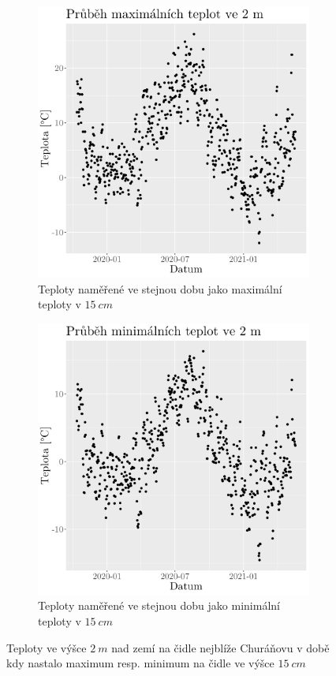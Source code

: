 \begin{figure}
	\centering
	\begin{subfigure}{0.45\textwidth}
  \includegraphics[width=\textwidth]{img/2mmaxtempmax15cm.png}
		\caption{Teploty naměřené ve stejnou dobu jako maximální teploty v $\SI{15}{cm}$}
		\label{fig:2mmaxtempmax15cm}
	\end{subfigure}
	\hfill
	\begin{subfigure}{0.45\textwidth}
  \includegraphics[width=\textwidth]{img/2mmaxtempmin15cm.png}
		\caption{Teploty naměřené ve stejnou dobu jako minimální teploty v $\SI{15}{cm}$}
		\label{fig:2mmaxtempmin15cm}
	\end{subfigure}
	\caption{Teploty ve výšce $\SI{2}{m}$ nad zemí na čidle nejblíže Churáňovu v době kdy nastalo maximum resp. minimum na čidle ve výšce $\SI{15}{cm}$}
	\label{fig:2mhours}
\end{figure}

